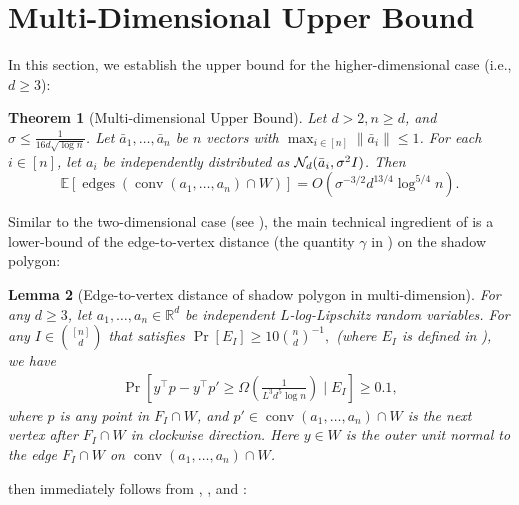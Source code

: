 \documentclass{article}\usepackage[a4paper,margin=20mm]{geometry}
\newtheorem{theorem}{Theorem}\newtheorem{lemma}[theorem]{Lemma}\newtheorem{proposition}[theorem]{Proposition}\newtheorem{corollary}[theorem]{Corollary}\newtheorem{definition}[theorem]{Definition}\newtheorem{claim}[theorem]{Claim}\newtheorem{remark}[theorem]{Remark}\newtheorem{observation}[theorem]{Observation}\newtheorem{conjecture}[theorem]{Conjecture}\newtheorem{example}[theorem]{Example}
\newcommand{\R}{\mathbb R}
\newcommand{\E}{\mathbb E}
\newcommand{\conv}{\operatorname{conv}}
\newcommand{\edges}{\operatorname{edges}}
\begin{document}
\section{Multi-Dimensional Upper Bound}\label{sec:ub-multi-new}


In this section, we establish the upper bound for the higher-dimensional case (i.e., $d \geq 3$):
\begin{theorem}[Multi-dimensional Upper Bound]\label{thm:ub-multi}
    Let $d > 2, n \geq d$, and $\sigma \leq \frac{1}{16d\sqrt{\log n}}$.
    Let $\bar{a}_1, \ldots, \bar{a}_n$ be $n$ vectors with $\max_{i \in [n]} \|\bar{a}_i\| \leq 1$. For each $i \in [n]$, let $a_i$ be independently distributed as
    $\mathcal{N}_d(\Bar{a}_i, \sigma^2 I)$. Then
    \begin{equation}\label{eq:ub-multi}
        \E[\edges( \conv(a_1,\dots,a_n) \cap W)] = O\left( \sigma^{-3/2} d^{13/4} \log^{5/4} n \right).
    \end{equation}
\end{theorem}

Similar to the two-dimensional case (see ), the main technical ingredient of  is a lower-bound of the edge-to-vertex distance (the quantity $\gamma$ in ) on the shadow polygon:

\begin{lemma}[Edge-to-vertex distance of shadow polygon in multi-dimension]\label{lem:normalvector}
    For any $d \geq 3$,
    let $a_1, \ldots, a_n \in \R^d$ be independent $L$-log-Lipschitz random variables.
    For any $I \in \binom{[n]}{d}$ that satisfies
    \(
    \Pr[E_I] \geq 10\binom{n}{d}^{-1},
    \)
    (where $E_I$ is defined in ),
    we have
    \begin{align*}
        \Pr[y^\top p - y^\top p' \geq  \Omega(\frac{1}{L^3d^5 \log n})\mid E_I ] \geq 0.1,
    \end{align*}
    where $p$ is any point in $F_I \cap W$, and $p' \in \conv(a_1,\dots,a_n)\cap W$ is the next vertex after $F_I \cap W$ in clockwise direction.
    Here $y \in W$ is the outer unit normal to the edge $F_I \cap W$ on $\conv(a_1, \ldots, a_n) \cap W$.
\end{lemma}

 then immediately follows from , ,  and :
\end{document}
